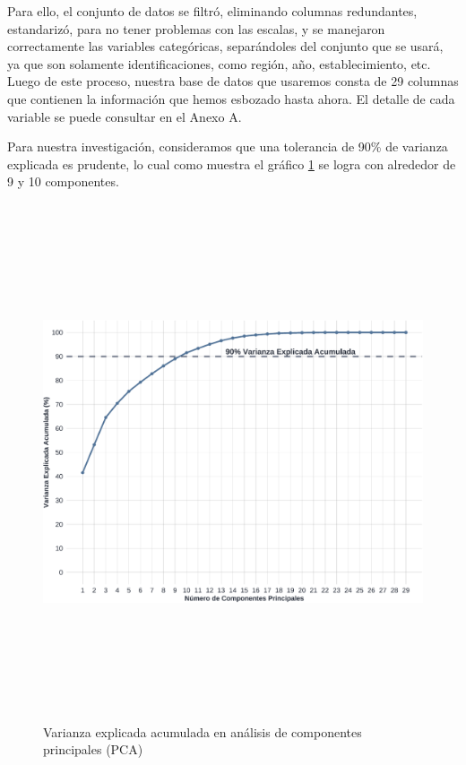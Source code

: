 \documentclass[
  12pt,
  letterpaper,
]{article}
\begin{document}
Para ello, el conjunto de datos se filtró, eliminando columnas redundantes, estandarizó, para no tener problemas con las escalas, y se manejaron correctamente las variables categóricas, separándoles del conjunto que se usará, ya que son solamente identificaciones, como región, año, establecimiento, etc.
Luego de este proceso, nuestra base de datos que usaremos consta de 29 columnas que contienen la información que hemos esbozado hasta ahora.
El detalle de cada variable se puede consultar en el Anexo A.

Para nuestra investigación, consideramos que una tolerancia de 90\% de varianza explicada es prudente, lo cual como muestra el gráfico \ref{fig:grafico-var-acum} se logra con alrededor de 9 y 10 componentes.

\begin{figure}

{\centering \includegraphics[width=0.8\linewidth,height=6in]{tesis_ver_final_files/figure-latex/grafico-var-acum-1} 

}

\caption{Varianza explicada acumulada en análisis de componentes principales (PCA)}\label{fig:grafico-var-acum}
\end{figure}
\end{document}
